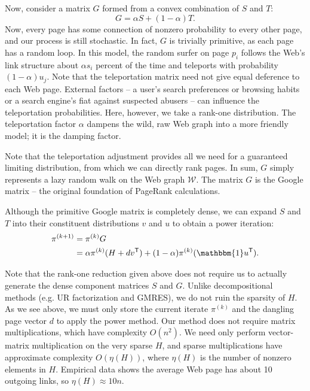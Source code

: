 \documentclass[11pt,letterpaper]{amsart}
\newcommand{\transpose}[1]{#1^{\mathsf{T}}}
\newcommand{\iterate}[2]{#1^{(#2)}}
\begin{document}
Now, consider a matrix $G$ formed from a convex combination of $S$ and $T$:
\begin{equation}
  \label{eqn:google_matrix}
  G = \alpha S + (1-\alpha)T.
\end{equation}
Now, every page has some connection of nonzero probability to every other page,
and our process is still stochastic. In fact, $G$ is trivially primitive, as
each page has a random loop. In this model, the random surfer on page $p_i$
follows the Web's link structure about $\alpha s_i$ percent of the time and
teleports with probability $(1-\alpha) u_j$. Note that the teleportation matrix
need not give equal deference to each Web page. External factors -- a user's
search preferences or browsing habits or a search engine's fiat against
suspected abusers -- can influence the teleportation probabilities. Here,
however, we take a rank-one distribution. The teleportation factor $\alpha$
dampens the wild, raw Web graph into a more friendly model; it is the damping
factor.

Note that the teleportation adjustment provides all we need for a guaranteed
limiting distribution, from which we can directly rank pages. In sum, $G$ simply
represents a lazy random walk on the Web graph $\mathcal{W}$. The matrix $G$ is
the Google matrix -- the original foundation of PageRank calculations.

Although the primitive Google matrix is completely dense, we can expand $S$ and
$T$ into their constituent distributions $v$ and $u$ to obtain a power
iteration:
\begin{align*}
  \iterate{\pi}{k+1} &= \iterate{\pi}{k} G \\
                     &= \alpha \iterate{\pi}{k} (H + d \transpose{v}) + (1 - \alpha) \iterate{\pi}{k} (\mathbbm{1} \transpose{u}).
\end{align*}

Note that the rank-one reduction given above does not require us to actually
generate the dense component matrices $S$ and $G$. Unlike decompositional
methods (e.g. UR factorization and GMRES), we do not ruin the sparsity of $H$.
As we see above, we must only store the current iterate $\iterate{\pi}{k}$ and
the dangling page vector $d$ to apply the power method. Our method does not
require matrix multiplications, which have complexity $O(n^2)$. We need only
perform vector-matrix multiplication on the very sparse $H$, and sparse
multiplications have approximate complexity $O(\eta(H))$, where $\eta(H)$ is the
number of nonzero elements in $H$. Empirical data shows the average Web page has
about 10 outgoing links, so $\eta(H) \approx 10n$.
\end{document}
